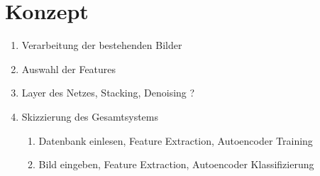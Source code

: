 \chapter{Konzept}

\begin{enumerate}
	\item Verarbeitung der bestehenden Bilder
	\item Auswahl der Features
	\item Layer des Netzes, Stacking, Denoising ?
	\item Skizzierung des Gesamtsystems \begin{enumerate}
		\item Datenbank einlesen, Feature Extraction, Autoencoder Training
		\item Bild eingeben, Feature Extraction, Autoencoder Klassifizierung
	\end{enumerate}		
	
\end{enumerate}
